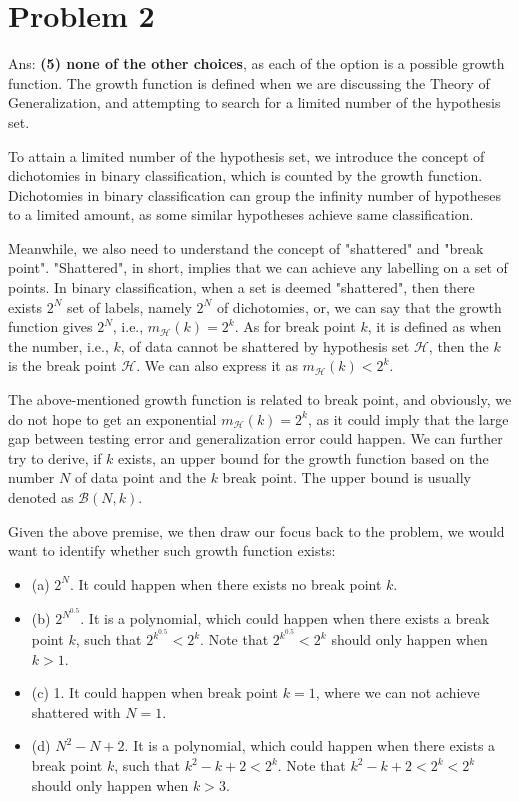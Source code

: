 \documentclass[a4paper,12pt]{article}
\begin{document}
\section*{Problem 2}
\noindent Ans: \textbf{(5) none of the other choices}, as each of the option is a possible growth 
function. 
The growth function is defined when we are discussing the Theory of Generalization,
and attempting to search for a limited number of the hypothesis set.

To attain a limited number of the hypothesis set, we introduce the concept of dichotomies
in binary classification, 
which is counted by the growth function.
Dichotomies in binary classification can group the infinity number of hypotheses to 
a limited amount, as some similar hypotheses achieve same classification.

Meanwhile, we also need to understand the concept of "shattered" and "break point".
"Shattered", in short, implies that we can achieve any labelling on a set of points. 
In binary classification, when a set is deemed "shattered", then there exists
$2^{N}$ set of labels, namely $2^N$ of dichotomies, or, we can say that 
the growth function gives $2^N$, i.e., $m_{\mathcal{H}}(k) = 2^k$.
As for break point $k$, it is defined as when the number, i.e., $k$, of data 
cannot be shattered by hypothesis set $\mathcal{H}$,
then the $k$ is the break point $\mathcal{H}$.
We can also express it as $m_{\mathcal{H}}(k) < 2^k$.

The above-mentioned growth function is related to break point, 
and obviously, we do not 
hope to get an exponential
$m_{\mathcal{H}}(k) = 2^k$, as it could imply that the large gap between testing error
and generalization error could happen. 
We can further try to derive, if $k$ exists, an upper bound for the growth function
based on the number $N$ of data point and the $k$ break point.
The upper bound is usually denoted as $\mathcal{B}(N,k)$.

Given the above premise, we then draw our focus back to the problem, 
we would want to identify whether such growth function exists:

\begin{itemize}
   \item (a) $2^N$. It could happen when there exists no break point $k$.
   \item (b) $2^{N^{0.5}}$. It is a polynomial, which could happen when there exists a break point $k$, 
             such that $2^{k^{0.5}} < 2^k$. 
             Note that $2^{k^{0.5}} < 2^k$ should only happen when $k > 1$.
   \item (c) 1. It could happen when break point $k=1$, where we can not achieve shattered
             with $N=1$.
   \item (d) $N^2 - N + 2$. It is a polynomial, which could happen when there exists a break 
             point $k$, such that $k^2 - k + 2 < 2^k$.
             Note that $k^2 - k + 2 < 2^k < 2^k$ should only happen when $k > 3$.
\end{itemize}
\end{document}
